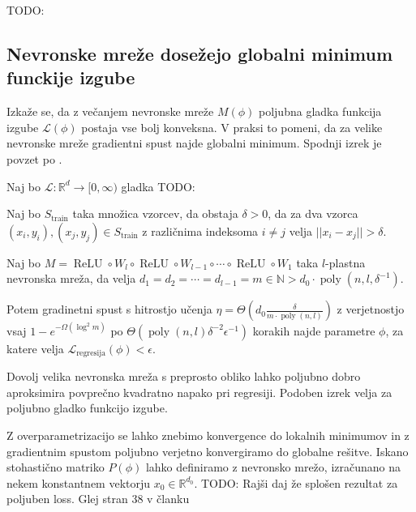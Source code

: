\documentclass[mat2, tisk]{fmfdelo}
\newcommand{\TODO}[1]{{\color{blue} TODO: #1}}
\newcommand{\R}{\mathbb R}
\newcommand{\N}{\mathbb N}
\newcommand{\loss }{\mathcal L}
\newcommand{\Loss}[1]{\mathcal L _\text{#1}}
\begin{document}
            \begin{definicija}
              \TODO{}
            \end{definicija}

            \subsection{Nevronske mreže dosežejo globalni minimum
            funckije izgube}
            Izkaže se, da z večanjem nevronske mreže $M(\phi)$
            poljubna gladka funkcija izgube $\loss (\phi) $ postaja vse
            bolj konveksna. V praksi to pomeni, da za velike
            nevronske mreže gradientni spust najde globalni minimum.
            Spodnji izrek je povzet po
            \cite{allenzhu2019convergencetheorydeeplearning}.
            \begin{izrek}
              \label{izrek:allen-zhu-global-minima}
              Naj bo $\loss \colon \R^d \to [0, \infty)$ gladka \TODO{}

              Naj bo $S_\text{train}$ taka množica vzorcev, da
              obstaja $\delta > 0$, da za dva  vzorca $(x_i, y_i),
              (x_j,y_j) \in S_\text{train}$ z različnima indeksoma $i
              \neq j $ velja $||x_i - x_j|| > \delta$.

              Naj bo $M = \operatorname{ReLU} \circ W_l \circ
              \operatorname{ReLU} \circ W_{l-1} \circ \dotsm \circ
              \operatorname{ReLU} \circ W_1$  taka $l$-plastna
              nevronska mreža, da velja $d_1 = d_2 = \dotsm = d_{l-1}
              = m \in \N > d_0 \cdot \operatorname{poly}(n, l, \delta^{-1})$.

              Potem gradinetni spust s hitrostjo učenja $\eta =
              \Theta (d_0 \frac{\delta}{m \cdot
              \operatorname{poly}(n, l)})$ z verjetnostjo vsaj $1 -
              e^{- \Omega(\log^2 m)}$  po
              $\Theta(\operatorname{poly}(n, l) \delta^{-2} \epsilon
              ^{-1})$ korakih najde parametre $\phi$, za katere velja
              $\Loss{regresija}(\phi) < \epsilon$.
            \end{izrek}
            Dovolj velika nevronska mreža s preprosto obliko lahko
            poljubno dobro aproksimira povprečno kvadratno napako pri
            regresiji. Podoben izrek velja za poljubno gladko funkcijo izgube.

            Z overparametrizacijo se lahko znebimo konvergence do
            lokalnih minimumov in z gradientnim spustom poljubno
            verjetno konvergiramo do globalne rešitve. Iskano
            stohastično matriko $P(\phi)$ lahko definiramo z
            nevronsko mrežo, izračunano na nekem konstantnem vektorju
            $x_0 \in \R^{d_0}$.
            \TODO{Rajši daj že splošen rezultat za poljuben loss.
            Glej stran 38 v članku}
\end{document}
